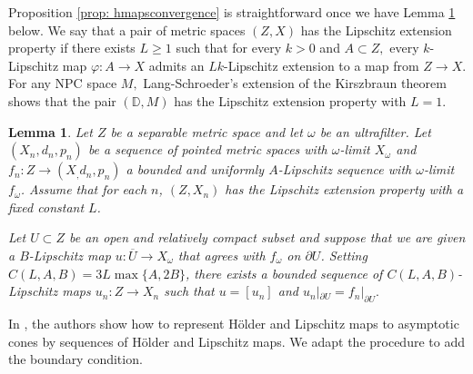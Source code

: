 \documentclass[10pt]{amsart}
\newtheorem{lem}[thm]{Lemma}
\theoremstyle{definition}
\begin{document}
Proposition \ref{prop: hmapsconvergence} is straightforward once we have Lemma \ref{lem: sequence} below. We say that a pair of metric spaces $(Z,X)$ has the Lipschitz extension property if there exists $L\geq 1$ such that for every $k>0$ and $A\subset Z,$ every $k$-Lipschitz map $\varphi: A\to X$ admits an $Lk$-Lipschitz extension to a map from $Z\to X.$ For any NPC space $M,$ Lang-Schroeder's extension of the Kirszbraun theorem \cite[Theorem A]{zora22244} shows that the pair $(\mathbb{D},M)$ has the Lipschitz extension property with $L=1.$
\begin{lem}\label{lem: sequence}
    Let $Z$ be a separable metric space and let $\omega$ be an ultrafilter. Let $(X_n,d_n,p_n)$ be a sequence of pointed metric spaces with $\omega$-limit $X_\omega$ and $f_n: Z\to (X_,d_n,p_n)$ a bounded and uniformly $A$-Lipschitz sequence with $\omega$-limit $f_\omega$. Assume that for each $n$, $(Z,X_n)$ has the Lipschitz extension property with a fixed constant $L$.
    
    Let $U\subset Z$ be an open and relatively compact subset and suppose that we are given a $B$-Lipschitz map $u:\overline{U}\to X_\omega$ that agrees with $f_\omega$ on $\partial U$. Setting $C(L,A,B)=3L\max\{A,2B\}$, there exists a bounded sequence of $C(L,A,B)$-Lipschitz maps $u_n: Z \to X_n$ such that $u=[u_n]$ and $u_n|_{\partial U}=f_n|_{\partial U}.$
\end{lem}
In \cite[Proposition 2.4]{LWY}, the authors show how to represent H{\"o}lder and Lipschitz maps to asymptotic cones by sequences of H{\"o}lder and Lipschitz maps. We adapt the procedure to add the boundary condition.
\end{document}
